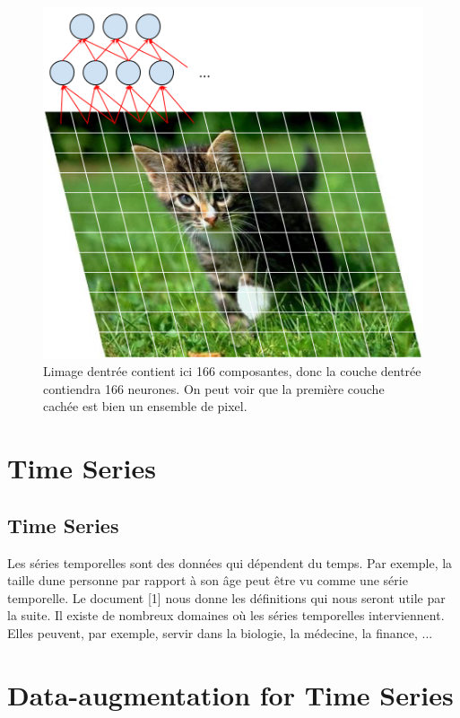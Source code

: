 \documentclass[11pt]{sdm}
\begin{document}
			\begin{figure}[!ht]
				\centering
				\includegraphics[natwidth=474,natheight=504]{figures/cnnOnImage.png}
				\caption{L\textquotesingle image d\textquotesingle entr\'ee contient ici 166 composantes, donc la couche d\textquotesingle entr\'ee contiendra 166 neurones. On peut voir que la premi\`ere couche cach\'ee est bien un ensemble de pixel.}
				\label{fig:cnnChat}
			\end{figure}






\section{Time Series}

	\subsection{Time Series}
		Les s\'eries temporelles sont des donn\'ees qui d\'ependent du temps. Par exemple, la taille d\textquotesingle une personne par rapport \`a son âge peut \^etre vu comme une s\'erie temporelle. Le document [1] nous donne les d\'efinitions qui nous seront utile par la suite.
		Il existe de nombreux domaines o\`u les s\'eries temporelles interviennent. Elles peuvent, par exemple, servir dans la biologie, la m\'edecine, la finance, ...



\section{Data-augmentation for Time Series}
\end{document}
